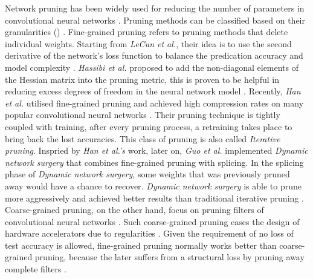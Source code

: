 \documentclass[a4paper,12pt]{report}
\begin{document}
Network pruning has been widely used for reducing the number of
parameters in convolutional neural networks \cite{Lecun1998gradient, Hassibi, Srinivas2015}.
Pruning methods can be classified based on their granularities () \cite{mao2017exploring}.
Fine-grained pruning refers to pruning methods that delete individual weights.
Starting from \textit{LeCun et al.}, their idea is to use the second derivative
of the network's loss function to balance the predication accuracy and model complexity \cite{Lecun1998gradient}.
\textit{Hassibi et al.} proposed to add the non-diagonal elements of the
Hessian matrix into the pruning metric, this is proven to be helpful in reducing
excess degrees of freedom in the neural network model \cite{Hassibi}.
Recently, \textit{Han et al.} utilised fine-grained pruning and achieved
high compression rates on many popular convolutional neural networks \cite{Han15}.
Their pruning technique is tightly coupled with training, after every pruning process,
a retraining takes place to bring back the lost accuracies.
This class of pruning is also called \textit{Iterative pruning}.
Inspried by \textit{Han et al.'s} work, later on, \textit{Guo et al.} implemented
\textit{Dynamic network surgery} that combines fine-grained pruning with splicing.
In the splicing phase of \textit{Dynamic network surgery}, some weights that was previously pruned
away would have a chance to recover.
\textit{Dynamic network surgery} is able to prune more aggressively and achieved
better results than traditional iterative pruning \cite{Guo}.
Coarse-grained pruning, on the other hand, focus on pruning filters of convolutional
neural networks \cite{DBLP:journals/corr/LiKDSG16}.
Such coarse-grained pruning eases the design of hardware accelerators
due to regularities \cite{DBLP:journals/corr/WenWWCL16, DBLP:journals/corr/LebedevL15}.
Given the requirement of no loss of test accuracy is allowed, fine-grained pruning
normally works better than coarse-grained pruning, because the later suffers from
a structural loss by pruning away complete filters \cite{DBLP:journals/corr/LiKDSG16}.
\end{document}
